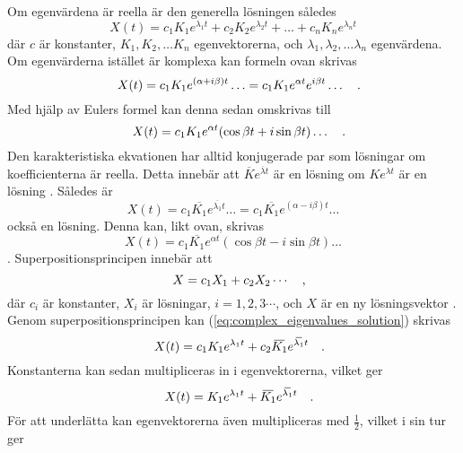 Om egenvärdena är reella är den generella lösningen således
\begin{equation}                      
    X(t)=c_1K_1e^{\lambda_1t}+c_2K_2e^{\lambda_2t}+\hdots+c_nK_ne^{\lambda_nt}
\end{equation}
där \(c\) är konstanter, \(K_1, K_2, \hdots K_n\) egenvektorerna, och \(\lambda_1, \lambda_2, \hdots \lambda_n\) egenvärdena.
Om egenvärderna istället är komplexa kan formeln ovan skrivas
\begin{equation}\label{eq:complex_eigenvalues_solution}
    X(t)=c_1K_1e^{(\alpha+i\beta)t}\hdots=c_1K_1e^{\alpha t} e^{i\beta t}\hdots
\quad\mathrm{.}\!\!\!\!\!\!\end{equation}
Med hjälp av Eulers formel kan denna sedan omskrivas till
\begin{equation}
    X(t)=c_1K_1e^{\alpha t}(\cos\beta t + i\sin\beta t)\hdots
\quad\mathrm{.}\!\!\!\!\!\!\end{equation} Den karakteristiska ekvationen har alltid konjugerade par som lösningar om koefficienterna är reella. Detta innebär att \(\overbar{K}e^{\overbar{\lambda}t}\) är en lösning om \(Ke^{\lambda t}\) är en lösning \parencite[342]{zill_differential_2005}. Således är
\begin{equation}
    X(t)=c_1\overbar{K_1}e^{\overbar{\lambda_1}t}\hdots=c_1\overbar{K_1}e^{(\alpha-i\beta)t}\hdots
\end{equation} också en lösning. Denna kan, likt ovan, skrivas
\begin{equation}
    X(t)=c_1\overbar{K_1}e^{\alpha t}(\cos\beta t - i\sin\beta t)\hdots
\end{equation} \parencite[347-348]{zill_differential_2005}. Superpositionsprincipen innebär att
\begin{equation}
    X=c_1X_1+c_2X_2\cdots
\quad\mathrm{,}\!\!\!\!\!\!\end{equation} där \(c_i\) är konstanter, \(X_i\) är lösningar, \(i=1,2,3\cdots\), och \(X\) är en ny lösningsvektor \parencite[333]{zill_differential_2005}. Genom superpositionsprincipen kan (\ref{eq:complex_eigenvalues_solution}) skrivas
\begin{equation}
    X(t)=c_1K_1e^{\lambda_1 t}+c_2\overbar{K_1}e^{\overbar{\lambda_1}t}
\eqph{.}\end{equation} Konstanterna kan sedan multipliceras in i egenvektorerna, vilket ger
\begin{equation}
    X(t)=K_1e^{\lambda_1 t}+\overbar{K_1}e^{\overbar{\lambda_1}t}
\eqph{.}\end{equation} För att underlätta kan egenvektorerna även multipliceras med \(\frac{1}{2}\), vilket i sin tur ger
